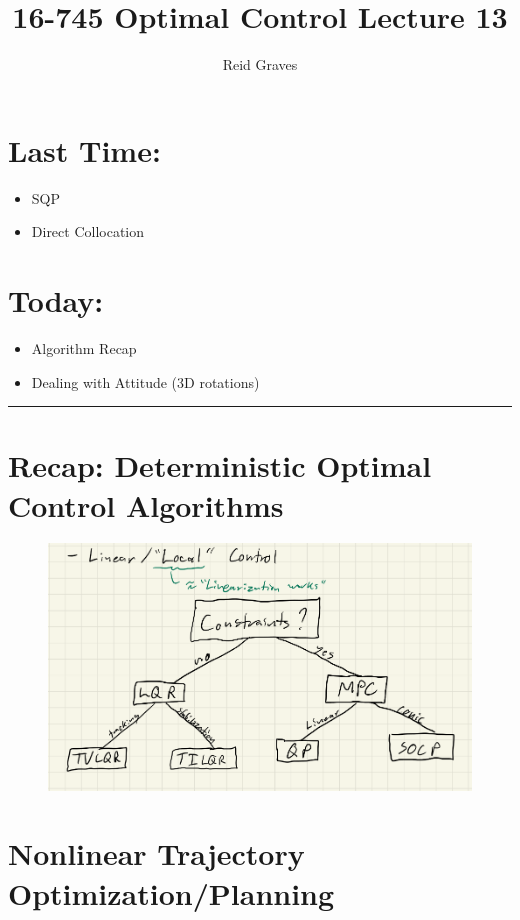 \documentclass[11pt]{article}
\title{16-745 Optimal Control Lecture 13}
\author{Reid Graves}
\begin{document}
\maketitle

\section*{Last Time:}
\begin{itemize}
    \item SQP
    \item Direct Collocation
\end{itemize}

\section*{Today:}
\begin{itemize}
    \item Algorithm Recap
    \item Dealing with Attitude (3D rotations)
\end{itemize}

\noindent\rule{\textwidth}{0.4pt} %

\section*{Recap: Deterministic Optimal Control Algorithms}
\begin{figure}[H]
    \centering
    \includegraphics[width=\linewidth]{lecture_14_1.png}
\end{figure}


\section*{Nonlinear Trajectory Optimization/Planning}
\end{document}
